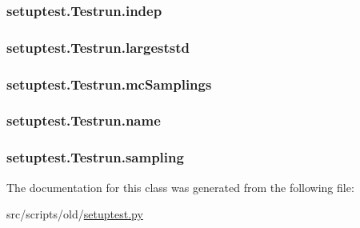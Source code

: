 \hypertarget{classsetuptest_1_1_testrun_a82322256ed240db2a584a35134b3e43b}{
\subsubsection[{indep}]{\setlength{\rightskip}{0pt plus 5cm}setuptest.\-Testrun.\-indep}}\label{classsetuptest_1_1_testrun_a82322256ed240db2a584a35134b3e43b}
\hypertarget{classsetuptest_1_1_testrun_a0c18cf42e638472b96e8884474d97045}{
\subsubsection[{largeststd}]{\setlength{\rightskip}{0pt plus 5cm}setuptest.\-Testrun.\-largeststd}}\label{classsetuptest_1_1_testrun_a0c18cf42e638472b96e8884474d97045}
\hypertarget{classsetuptest_1_1_testrun_a1420fdcf878658bf1bc6e19ffb30a572}{
\subsubsection[{mc\-Samplings}]{\setlength{\rightskip}{0pt plus 5cm}setuptest.\-Testrun.\-mc\-Samplings}}\label{classsetuptest_1_1_testrun_a1420fdcf878658bf1bc6e19ffb30a572}
\hypertarget{classsetuptest_1_1_testrun_afc9309e5536064a4cf772c9345e39fbd}{
\subsubsection[{name}]{\setlength{\rightskip}{0pt plus 5cm}setuptest.\-Testrun.\-name}}\label{classsetuptest_1_1_testrun_afc9309e5536064a4cf772c9345e39fbd}
\hypertarget{classsetuptest_1_1_testrun_aabb9f14dd901cdceeb0f0884341ff8c5}{
\subsubsection[{sampling}]{\setlength{\rightskip}{0pt plus 5cm}setuptest.\-Testrun.\-sampling}}\label{classsetuptest_1_1_testrun_aabb9f14dd901cdceeb0f0884341ff8c5}


The documentation for this class was generated from the following file\-:\begin{DoxyCompactItemize}
\item 
src/scripts/old/\hyperlink{setuptest_8py}{setuptest.\-py}\end{DoxyCompactItemize}
